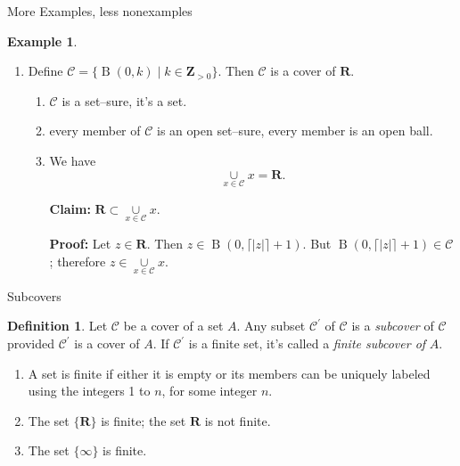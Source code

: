\documentclass[fleqn]{beamer}
\newcommand{\reals}{\mathbf{R}}
\newcommand{\integers}{\mathbf{Z}}
\newcommand{\cover}{\mathcal{C}}
\DeclareMathOperator{\ball}{B}
\theoremstyle{definition}
\newtheorem{mydef}{Definition}
\newtheorem{myex}{Example}
\begin{document}
\begin{frame}{More Examples, less  nonexamples}

  \begin{myex}

    \begin{enumerate}
\item Define \(\cover = \{ \ball(0,k) \mid k \in \integers_{> 0} \}\). Then \(\cover\) is a cover of \(\reals\).
\begin{enumerate}
    \item   \(\cover \) is a set--sure, it's a set.

   \item every member of \(\cover \) is an open set--sure,  every member is an open ball.

    \item We have
     \[
      \underset{x \in  \cover }{\cup} x = \reals. 
     \]
   
\textbf{Claim:}   \(\reals \subset   \underset{x \in  \cover }{\cup} x \).

\textbf{ Proof:}  Let \(z \in \reals\).  Then \(z \in \ball(0, \lceil |z| \rceil + 1) \).  But \(  \ball(0, \lceil |z| \rceil + 1) \in \cover \); therefore \(z \in   \underset{x \in  \cover }{\cup} x \).
\end{enumerate}
\end{enumerate}
\end{myex}
\end{frame}

\begin{frame}{Subcovers}

\begin{mydef}  Let \(\cover\) be a cover of a set \(A\).  Any subset \(\cover^\prime\) of \(\cover\) is a \emph{subcover}  of \(\cover\) provided \(\cover^\prime\) is a cover of \(A\).
If \(\cover^\prime\) is a finite set, it's called a \emph{finite subcover of} \(A\). 
\end{mydef}

\begin{enumerate}

\item A set is finite if either it is empty or  its members can be uniquely labeled using the integers 1 to \(n\), for some integer \(n\).

\item The set \(\{ \reals \} \) is  finite; the set \(\reals\) is not finite.


\item The set \(\{ \infty \} \) is  finite. 
\end{enumerate}

\end{frame}
\end{document}
